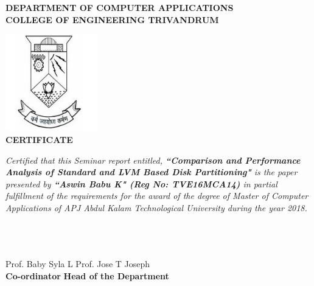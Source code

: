 \begin{titlepage}
\begin{center}
\textbf{DEPARTMENT OF COMPUTER APPLICATIONS}\\[0.5cm]
\textbf{ COLLEGE OF ENGINEERING TRIVANDRUM}\\
[0.5cm]
\vspace{1.2cm}

\includegraphics[width=0.30\textwidth]{./logo}\\
\vspace{0.8cm}
\textbf{CERTIFICATE}\\
\end{center}

\emph{Certified that this Seminar report entitled,
\textbf{``Comparison and Performance Analysis of Standard and LVM Based Disk
Partitioning"} is the paper presented by \textbf{``Aswin Babu K"
(Reg No: TVE16MCA14)} in partial fulfillment of the requirements for the award
of the degree of Master of Computer Applications of APJ Abdul Kalam
Technological University during the year 2018.}\\\\\\\\
\vspace{0.5cm}

Prof. Baby Syla L
\hspace{9.5cm} Prof. Jose T Joseph\\ 

\textbf{Co-ordinator}
\hspace{8.9cm} \textbf{Head of the Department}

\end{titlepage}
